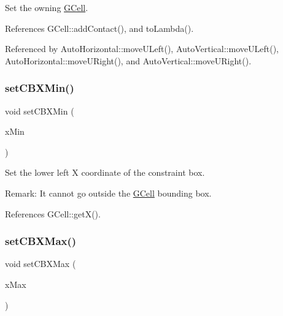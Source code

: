 Set the owning \hyperlink{classKatabatic_1_1GCell}{G\+Cell}. 

References G\+Cell\+::add\+Contact(), and to\+Lambda().



Referenced by Auto\+Horizontal\+::move\+U\+Left(), Auto\+Vertical\+::move\+U\+Left(), Auto\+Horizontal\+::move\+U\+Right(), and Auto\+Vertical\+::move\+U\+Right().

\mbox{\label{classKatabatic_1_1AutoContact_a9fcb986110e79bc0044f7bfe503acc0c}} 
\subsubsection{\texorpdfstring{set\+C\+B\+X\+Min()}{setCBXMin()}}
{\footnotesize\ttfamily void set\+C\+B\+X\+Min (\begin{DoxyParamCaption}\item[{\textbf{ Db\+U\+::\+Unit}}]{x\+Min }\end{DoxyParamCaption})\hspace{0.3cm}{\ttfamily [inline]}}

Set the lower left X coordinate of the constraint box.

\begin{DoxyParagraph}{Remark\+:}
It cannot go outside the \hyperlink{classKatabatic_1_1GCell}{G\+Cell} bounding box. 
\end{DoxyParagraph}


References G\+Cell\+::get\+X().

\mbox{\label{classKatabatic_1_1AutoContact_aaa7652f5db46cab9edb066d06ea979f9}} 
\subsubsection{\texorpdfstring{set\+C\+B\+X\+Max()}{setCBXMax()}}
{\footnotesize\ttfamily void set\+C\+B\+X\+Max (\begin{DoxyParamCaption}\item[{\textbf{ Db\+U\+::\+Unit}}]{x\+Max }\end{DoxyParamCaption})\hspace{0.3cm}{\ttfamily [inline]}}


